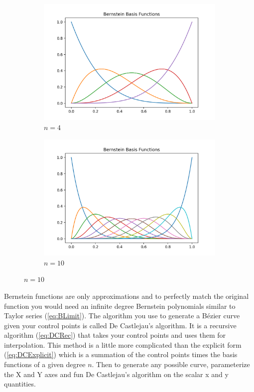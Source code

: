 \documentclass[12pt, letterpaper]{article}
\begin{document}
\begin{figure}[ht]
  \begin{center}
    \begin{subfigure}[b]{.45\linewidth}
      \includegraphics[width=\linewidth]{Basis/basis4}
      \caption{$n=4$}
    \end{subfigure}
    \begin{subfigure}[b]{.45\linewidth}
      \includegraphics[width=\linewidth]{Basis/basis10}
      \caption{$n=10$}
    \end{subfigure}
  \end{center}
\end{figure}

Bernstein functions are only approximations and to perfectly match the original function you would need an 
infinite degree Bernstein polynomials similar to Taylor series (\ref{eq:BLimit}). The algorithm you use to
generate a B\'ezier curve given your control points is called De Castlejau's algorithm. It is a recursive
algorithm (\ref{eq:DCRec}) that takes your control points and uses them for interpolation. This method is a
little more complicated than the explicit form (\ref{eq:DCExplicit}) which is a summation of the control
points times the basis functions of a given degree $n$. Then to generate any possible curve, parameterize the
X and Y axes and fun De Castlejau's algorithm on the scalar x and y quantities. 
\end{document}

